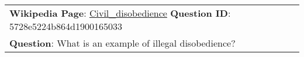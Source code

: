 \begin{figure*}[ht]
{\begin{tabular}{p{}}
            \textbf{Wikipedia Page}: \underline{Civil\_disobedience} \textbf{Question ID}: 5728e5224b864d1900165033                                                                                                                                                                                                                                                                                                                                                                                                                                                                                                                                                                                                                                                                                                                                                                                                                                                                                                                                                                                                                                                                                                                                                   \\
            \textbf{Question}: What is an example of illegal disobedience?                                                                                                                                                                                                                                                                                                                                                                                                                                                                                                                                                                                                                                                                                                                                                                                                                                                                                                                                                                                                                                                                                                                                                                                            \\

\end{tabular}}
\end{figure*}
